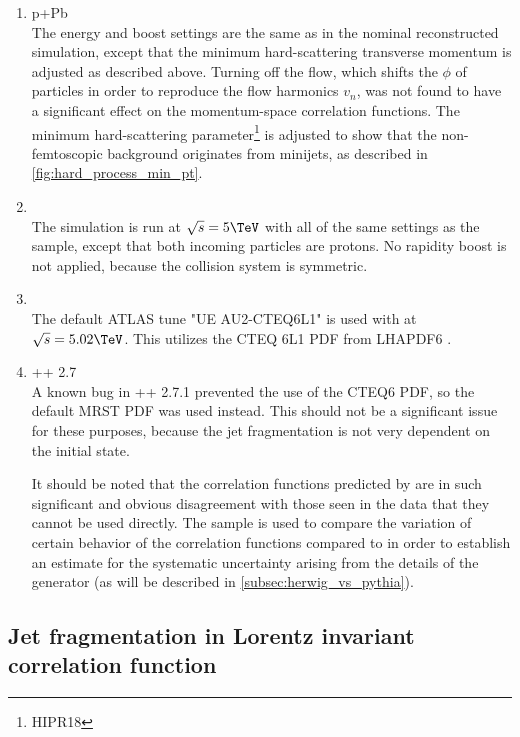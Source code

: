 \begin{enumerate}
\item \Hijing p+Pb \cite{Gyulassy:1994ew}\\
  The energy and boost settings are the same as in the nominal \pPb reconstructed simulation, except that the minimum hard-scattering transverse momentum is adjusted as described above.
  Turning off the flow, which shifts the $\phi$ of particles in order to reproduce the flow harmonics $v_n$, was not found to have a significant effect on the momentum-space correlation functions.
  The minimum hard-scattering \pt parameter\footnote{HIPR18} is adjusted to show that the non-femtoscopic background originates from minijets, as described in \cref{fig:hard_process_min_pt}.

\item \Hijing \pp\\
  The simulation is run at $\sqrt{s} = 5 \TeV$ with all of the same settings as the \pPb sample, except that both incoming particles are protons.
  No rapidity boost is not applied, because the collision system is symmetric.

\item {} \pp \cite{Sjostrand:2007gs}\\
The default ATLAS tune "UE AU2-CTEQ6L1" is used with \PYEight at $\sqrt{s} = 5.02 \TeV$.
This utilizes the CTEQ 6L1 \ac{PDF} from LHAPDF6 \cite{Buckley:2014ana}.

\item \Herwig++ 2.7 \pp \cite{Bahr:2008pv}\\
A known bug in \Herwig++ 2.7.1 prevented the use of the CTEQ6 \ac{PDF}, so the default MRST \ac{PDF} was used instead.
This should not be a significant issue for these purposes, because the jet fragmentation is not very dependent on the initial state.

It should be noted that the correlation functions predicted by \Herwig are in such significant and obvious disagreement with those seen in the data that they cannot be used directly.
The \Herwig sample is used to compare the variation of certain behavior of the correlation functions compared to \Pythia in order to establish an estimate for the systematic uncertainty arising from the details of the generator (as will be described in \cref{subsec:herwig_vs_pythia}).
\end{enumerate}


\subsection{Jet fragmentation in Lorentz invariant correlation function}
\label{subsec:jet_frag_inv}

